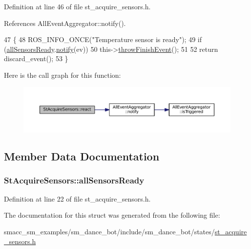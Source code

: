 Definition at line 46 of file st\+\_\+acquire\+\_\+sensors.\+h.



References All\+Event\+Aggregator\+::notify().


\begin{DoxyCode}
47    \{
48       ROS\_INFO\_ONCE(\textcolor{stringliteral}{"Temperature sensor is ready"});
49       \textcolor{keywordflow}{if} (\hyperlink{structStAcquireSensors_adc57ee1bdc2d1622b65811366f70845b}{allSensorsReady}.\hyperlink{classAllEventAggregator_aec3ce484f803c39cb1fddefb07611e45}{notify}(ev))
50          this->\hyperlink{classsmacc_1_1SmaccState_a56ccdfaf818ed6409dcbd4ab8b01c60e}{throwFinishEvent}();
51 
52       \textcolor{keywordflow}{return} discard\_event();
53    \}
\end{DoxyCode}


Here is the call graph for this function\+:
\nopagebreak
\begin{figure}[H]
\begin{center}
\leavevmode
\includegraphics[width=350pt]{structStAcquireSensors_af69db5f01143f5b9267fbd39fc566be8_cgraph}
\end{center}
\end{figure}




\subsection{Member Data Documentation}
\subsubsection[{\texorpdfstring{all\+Sensors\+Ready}{allSensorsReady}}]{ St\+Acquire\+Sensors\+::all\+Sensors\+Ready}\hypertarget{structStAcquireSensors_adc57ee1bdc2d1622b65811366f70845b}{}\label{structStAcquireSensors_adc57ee1bdc2d1622b65811366f70845b}


Definition at line 22 of file st\+\_\+acquire\+\_\+sensors.\+h.



The documentation for this struct was generated from the following file\+:\begin{DoxyCompactItemize}
\item 
smacc\+\_\+sm\+\_\+examples/sm\+\_\+dance\+\_\+bot/include/sm\+\_\+dance\+\_\+bot/states/\hyperlink{st__acquire__sensors_8h}{st\+\_\+acquire\+\_\+sensors.\+h}\end{DoxyCompactItemize}

